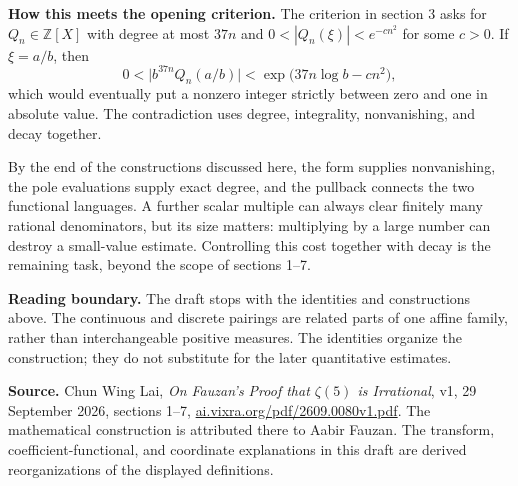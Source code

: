 \documentclass[11pt]{article}
\newcommand{\Z}{\mathbb Z}
\begin{document}
\textbf{How this meets the opening criterion.}
The criterion in section 3 asks for $Q_n\in\Z[X]$ with degree at most $37n$
and $0<|Q_n(\xi)|<e^{-cn^2}$ for some $c>0$. If $\xi=a/b$, then
\[
 0<\bigl|b^{37n}Q_n(a/b)\bigr|
 <\exp\bigl(37n\log b-cn^2\bigr),
\]
which would eventually put a nonzero integer strictly between zero and one
in absolute value. The contradiction uses degree, integrality, nonvanishing,
and decay together.

By the end of the constructions discussed here, the form supplies
nonvanishing, the pole evaluations supply exact degree, and the pullback
connects the two functional languages. A further scalar multiple can always
clear finitely many rational denominators, but its size matters: multiplying
by a large number can destroy a small-value estimate. Controlling this cost
together with decay is the remaining task, beyond the scope of sections 1--7.

\textbf{Reading boundary.}
The draft stops with the identities and constructions above. The continuous
and discrete pairings are related parts of one affine family, rather than
interchangeable positive measures. The identities organize the construction;
they do not substitute for the later quantitative estimates.

\vfill
{\small\textbf{Source.} Chun Wing Lai, \emph{On Fauzan's Proof that
$\zeta(5)$ is Irrational}, v1, 29 September 2026, sections 1--7,
\href{https://ai.vixra.org/pdf/2609.0080v1.pdf}{ai.vixra.org/pdf/2609.0080v1.pdf}.
The mathematical construction is attributed there to Aabir Fauzan.
The transform, coefficient-functional, and coordinate explanations in this
draft are derived reorganizations of the displayed definitions.}
\end{document}
